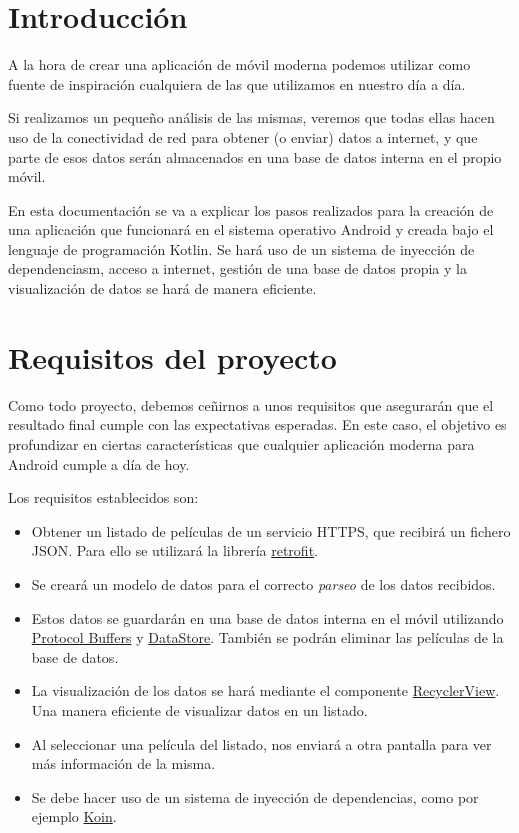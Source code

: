 \documentclass{\ClassPath/viu-tfm-template}
\begin{document}
    \graphicspath{{../../VIU_TFM_LaTeX_template/}}

    \coverpage

    \tableofcontents

\chapter{Introducción}

A la hora de crear una aplicación de móvil moderna podemos utilizar como fuente de inspiración cualquiera de las que utilizamos en nuestro día a día.

Si realizamos un pequeño análisis de las mismas, veremos que todas ellas hacen uso de la conectividad de red para obtener (o enviar) datos a internet, y que parte de esos datos serán almacenados en una base de datos interna en el propio móvil.

En esta documentación se va a explicar los pasos realizados para la creación de una aplicación que funcionará en el sistema operativo Android y creada bajo el lenguaje de programación Kotlin. Se hará uso de un sistema de inyección de dependenciasm, acceso a internet, gestión de una base de datos propia y la visualización de datos se hará de manera eficiente.


\chapter{Requisitos del proyecto}

Como todo proyecto, debemos ceñirnos a unos requisitos que asegurarán que el resultado final cumple con las expectativas esperadas. En este caso, el objetivo es profundizar en ciertas características que cualquier aplicación moderna para Android cumple a día de hoy.

Los requisitos establecidos son:

\begin{itemize}
    \item Obtener un listado de películas de un servicio HTTPS, que recibirá un fichero JSON. Para ello se utilizará la librería \href{https://github.com/square/retrofit}{retrofit}.
    \item Se creará un modelo de datos para el correcto \textit{parseo} de los datos recibidos.
    \item Estos datos se guardarán en una base de datos interna en el móvil utilizando \href{https://developers.google.com/protocol-buffers}{Protocol Buffers} y \href{https://developer.android.com/topic/libraries/architecture/datastore}{DataStore}. También se podrán eliminar las películas de la base de datos.
    \item La visualización de los datos se hará mediante el componente \href{https://developer.android.com/develop/ui/views/layout/recyclerview}{RecyclerView}. Una manera eficiente de visualizar datos en un listado.
    \item Al seleccionar una película del listado, nos enviará a otra pantalla para ver más información de la misma.
    \item Se debe hacer uso de un sistema de inyección de dependencias, como por ejemplo \href{https://insert-koin.io/}{Koin}.
\end{itemize}
\end{document}
